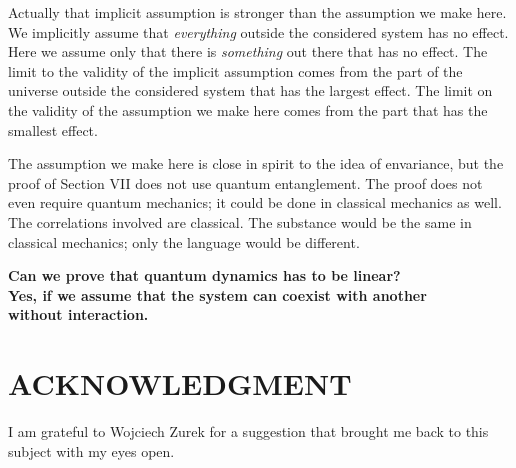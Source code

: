 \documentclass[pra, 12pt, showkeys, eqsecnum]{revtex4}
\begin{document}
Actually that implicit assumption is stronger than the assumption we make here. We implicitly assume that \textit{everything} outside the considered system has no effect. Here we assume only that there is \textit{something} out there that has no effect. The limit to the validity of the implicit assumption comes from the part of the universe outside the considered system that has the largest effect. The limit on the validity of the assumption we make here comes from the part that has the smallest effect.

The assumption we make here is close in spirit to the idea of envariance\cite{Zurek05}, but the proof of Section VII does not use quantum entanglement. The proof does not even require quantum mechanics; it could be done in classical mechanics as well. The correlations involved are classical. The substance would be the same in classical mechanics; only the language would be different.

\bigskip
\large
\noindent
\textbf{Can we prove that quantum dynamics has to be linear? \\ 
Yes, if we assume that the system can coexist with another \\ without interaction.} \\
\smallskip 
\normalsize

\section*{ACKNOWLEDGMENT}

I am grateful to Wojciech Zurek for a suggestion that brought me back to this subject with my eyes open.  




  
  




  


 




  





  

  





\end{document}
